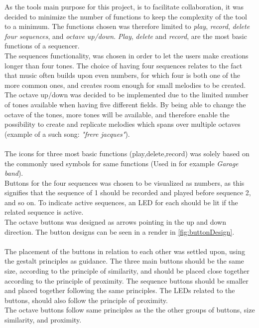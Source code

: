 As the tools main purpose for this project, is to facilitate collaboration, it was decided to minimize the number of functions to keep the complexity of the tool to a minimum. The functions chosen was therefore limited to \textit{play}, \textit{record}, \textit{delete} \textit{four sequences}, and \textit{octave up/down}. \textit{Play}, \textit{delete} and \textit{record}, are the most basic functions of a sequencer.\\
The sequences functionality, was chosen in order to let the users make creations longer than four tones. The choice of having four sequences relates to the fact that music often builds upon even numbers, for which four is both one of the more common ones\cite{tempo}, and creates room enough for small melodies to be created.\\
The octave up/down was decided to be implemented due to the limited number of tones available when having five different fields. By being able to change the octave of the tones, more tones will be available, and therefore enable the possibility to create and replicate melodies which spans over multiple octaves (example of a such song: \textit{"frere jacques"}).\\\\
The icons for three most basic functions (play,delete,record) was solely based on the commonly used symbols for same functions (Used in for example \textit{Garage band}\cite{Garageband}).\\ Buttons for the four sequences was chosen to be visualized as numbers, as this signifies that the sequence of 1 should be recorded and played before sequence 2, and so on. To indicate active sequences, an LED for each should be lit if the related sequence is active. \\ The octave buttons was designed as arrows pointing in the up and down direction. The button designs can be seen in a render in \autoref{fig:buttonDesign}.\\\\
The placement of the buttons in relation to each other was settled upon, using the gestalt principles\cite{gestalt} as guidance. The three main buttons should be the same size, according to the principle of similarity\cite{gestalt}, and should be placed close together according to the principle of proximity\cite{gestalt}. The sequence buttons should be smaller and placed together following the same principles. The LEDs related to the buttons, should also follow the principle of proximity\cite{gestalt}.\\ The octave buttons follow same principles as the the other groups of buttons, size similarity, and proximity.
 

